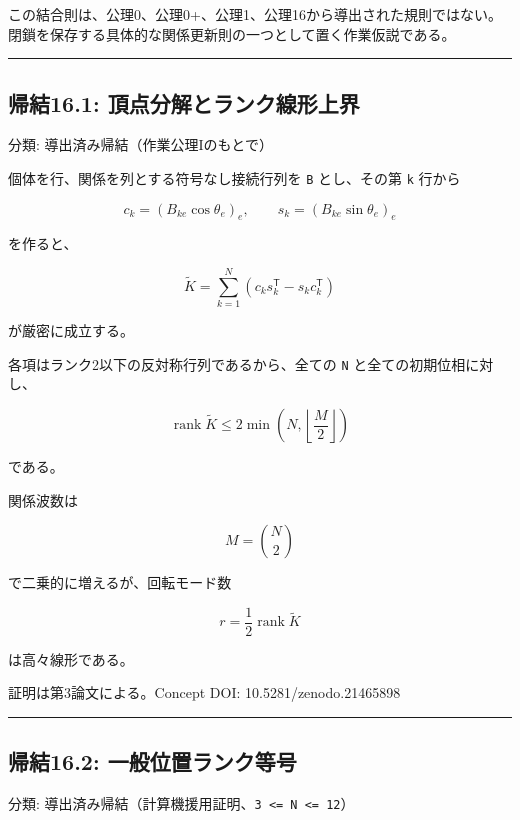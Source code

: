 \documentclass[
  a4paper,
]{ltjsarticle}
\begin{document}
この結合則は、公理0、公理0+、公理1、公理16から導出された規則ではない。閉鎖を保存する具体的な関係更新則の一つとして置く作業仮説である。

\begin{center}\rule{0.5\linewidth}{0.5pt}\end{center}

\subsection{帰結16.1:
頂点分解とランク線形上界}\label{ux5e30ux7d5016.1-ux9802ux70b9ux5206ux89e3ux3068ux30e9ux30f3ux30afux7ddaux5f62ux4e0aux754c}

分類: 導出済み帰結（作業公理Iのもとで）

個体を行、関係を列とする符号なし接続行列を \texttt{B} とし、その第
\texttt{k} 行から

\[
c_k=(B_{ke}\cos\theta_e)_{e},
\qquad
s_k=(B_{ke}\sin\theta_e)_{e}
\]

を作ると、

\[
\widetilde K=\sum_{k=1}^{N}\left(c_k s_k^{\mathsf T}-s_k c_k^{\mathsf T}\right)
\]

が厳密に成立する。

各項はランク2以下の反対称行列であるから、全ての \texttt{N}
と全ての初期位相に対し、

\[
\operatorname{rank}\widetilde K
\le
2\min\!\left(N,\left\lfloor\frac{M}{2}\right\rfloor\right)
\]

である。

関係波数は

\[
M=\binom{N}{2}
\]

で二乗的に増えるが、回転モード数

\[
r=\frac12\operatorname{rank}\widetilde K
\]

は高々線形である。

証明は第3論文による。Concept DOI: 10.5281/zenodo.21465898

\begin{center}\rule{0.5\linewidth}{0.5pt}\end{center}

\subsection{帰結16.2:
一般位置ランク等号}\label{ux5e30ux7d5016.2-ux4e00ux822cux4f4dux7f6eux30e9ux30f3ux30afux7b49ux53f7}

分類:
導出済み帰結（計算機援用証明、\texttt{3\ \textless{}=\ N\ \textless{}=\ 12}）
\end{document}
